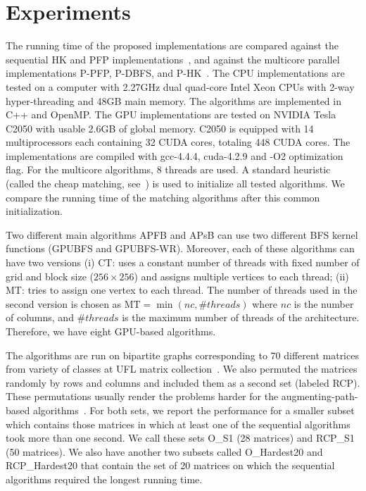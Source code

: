\documentclass[11pt,a4paper]{article}
\newcommand{\GPUone}{GPUBFS\xspace}
\newcommand{\GPUtwo}{GPUBFS-WR\xspace}
\newcommand{\mcpf}{P-PFP\xspace}
\newcommand{\mchk}{P-HK\xspace}
\newcommand{\mcbfs}{P-DBFS\xspace}
\newcommand{\APSBFS}{APsB\xspace}
\newcommand{\APFBFS}{APFB\xspace}
\begin{document}
\vspace*{-3ex}
\section{Experiments}\label{sec:exp}
\vspace*{-1ex}
The running time of the proposed implementations are compared against the 
sequential HK and PFP implementations~\cite{duff2011design}, and
against the multicore parallel implementations 
\mcpf, \mcbfs, and \mchk~\cite{ahrbka:12}. The 
CPU implementations are tested on a computer with 2.27GHz dual quad-core Intel Xeon CPUs with 
2-way hyper-threading and 48GB main memory. The algorithms are implemented in 
C++ and OpenMP. The GPU implementations are tested
on NVIDIA Tesla C2050 with usable 2.6GB of global memory. 
C2050 is equipped with 14 multiprocessors each containing 32 CUDA cores, 
totaling 448 CUDA cores. The implementations are compiled with gcc-4.4.4, cuda-4.2.9 and -O2 optimization flag. For the multicore algorithms, 
8 threads are used.  
A standard heuristic (called the cheap matching, see~\cite{duff2011design}) is used to initialize all tested algorithms.
We compare the running
time of the matching algorithms after this common initialization.

Two different main algorithms \APFBFS and \APSBFS can use two different BFS kernel functions (\GPUone{} and \GPUtwo{}).
Moreover, each of these algorithms can have two 
versions (i) CT: uses a constant number of threads with fixed number of grid and block size
($256\times 256$) and assigns multiple vertices to each thread; (ii) MT: tries to assign one vertex to each thread. The number
of threads used in the second version is chosen as $\mbox{MT} = \min(nc, \#threads)$
where $nc$ is the number of columns, and $\#threads$ is the 
maximum number of threads of the architecture. 
Therefore, we have eight GPU-based algorithms.

The algorithms are run on bipartite graphs corresponding to 70 different matrices 
from variety of classes 
at UFL matrix collection~\cite{dahu:11}. 
We also permuted the matrices randomly by rows and columns and included them as a second set (labeled RCP). These permutations usually render the problems
harder for the augmenting-path-based algorithms~\cite{duff2011design}. 
For both sets, we report the performance for a smaller subset which contains those matrices in which 
at least one of the sequential algorithms took more than one second.
We call these sets O\_S1 (28 matrices) and RCP\_S1 (50 matrices). We also have another two subsets called O\_Hardest20 and
RCP\_Hardest20 that contain the set of 20 matrices on which the sequential algorithms required the longest running time.
\end{document}
